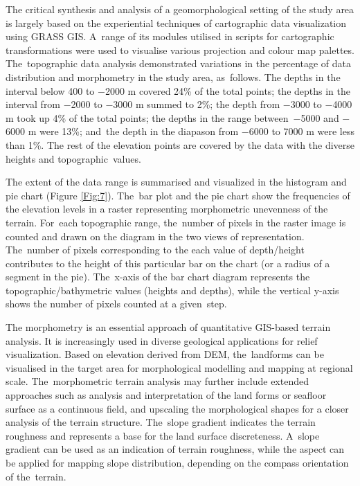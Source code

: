 \documentclass[technologies,article,accept,pdftex,moreauthors]{Definitions/mdpi}
\begin{document}
The critical synthesis and analysis of a geomorphological setting of the study area is largely based on the experiential techniques of cartographic data visualization using GRASS GIS. A~range of its modules utilised in scripts for cartographic transformations were used to visualise various projection and colour map palettes. The~topographic data analysis demonstrated variations in {the percentage of }data distribution and morphometry in the study area, as~follows.{ }The depths in the interval below 400 to $-$2000 m covered 24\% of the total points; the depths in the interval from $-$2000 to $-$3000 m summed to 2\%; the depth from $-$3000 to $-$4000 m took up 4\% of the total points; the depths in the range \mbox{between $-$5000} and $-$6000 m were 13\%; and~the depth in the diapason from $-$6000 to 7000 m were less than 1\%. {The} rest of the elevation points are covered by the data with {the} diverse heights and topographic~values.
  
The extent of the data range is summarised and visualized in the histogram and pie chart {(Figure }\ref{Fig:7}). The~bar plot and the pie chart show the frequencies of the elevation levels in a raster representing morphometric unevenness of the terrain. For~each topographic range, the~number of pixels in the raster image is counted and drawn on the diagram in the two views of representation. The~number of pixels corresponding to the each value of depth/height contributes to the height of this particular bar on the chart (or a radius of a segment in the pie). The~x-axis of the bar chart diagram represents the topographic/bathymetric values (heights and depths), while the vertical y-axis shows the number of pixels counted at a given~step.

The morphometry is an essential approach of quantitative GIS-based terrain analysis. It is increasingly used in diverse geological applications for relief visualization. Based on elevation {derived from} DEM, the~landforms can be visualised in the target area for morphological modelling and mapping at regional scale. The~morphometric terrain analysis may further include extended approaches such as analysis and interpretation of the land forms or seafloor surface as a continuous field, and upscaling the morphological shapes for a closer analysis of the terrain structure. The~slope gradient indicates the terrain roughness and represents a base %
for the land surface discreteness. A~slope gradient can be used as an indication of terrain roughness, while the aspect can be applied for mapping slope distribution, depending on the compass orientation of the~terrain. 
\end{document}
